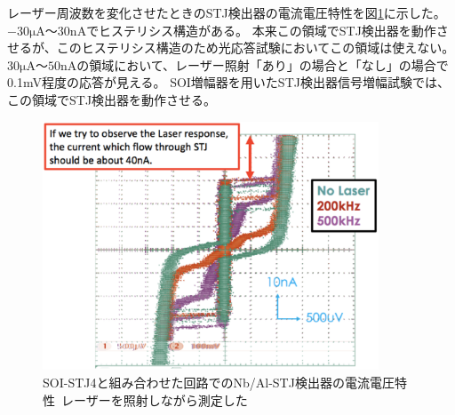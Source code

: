 		レーザー周波数を変化させたときのSTJ検出器の電流電圧特性を図\ref{fig:NbAlSTJwSOI_IV_chara_lazer}に示した。
		$-30 \mathrm{\mu A}$〜$30 \mathrm{nA}$でヒステリシス構造がある。
		本来この領域でSTJ検出器を動作させるが、このヒステリシス構造のため光応答試験においてこの領域は使えない。
		$30\mathrm{\mu A}$〜$50\mathrm{nA}$の領域において、レーザー照射「あり」の場合と「なし」の場合で0.1mV程度の応答が見える。
		SOI増幅器を用いたSTJ検出器信号増幅試験では、この領域でSTJ検出器を動作させる。
		\begin{figure}[htbp]
			\begin{center}
				\includegraphics[width=10.0cm]{./Chapter/Chapter4/Picture/NbAlSTJwSOI_IV_chara_lazer.eps}
				\caption{SOI-STJ4と組み合わせた回路でのNb/Al-STJ検出器の電流電圧特性\ レーザーを照射しながら測定した}
				\label{fig:NbAlSTJwSOI_IV_chara_lazer}
			\end{center}
		\end{figure}
		
		\clearpage
